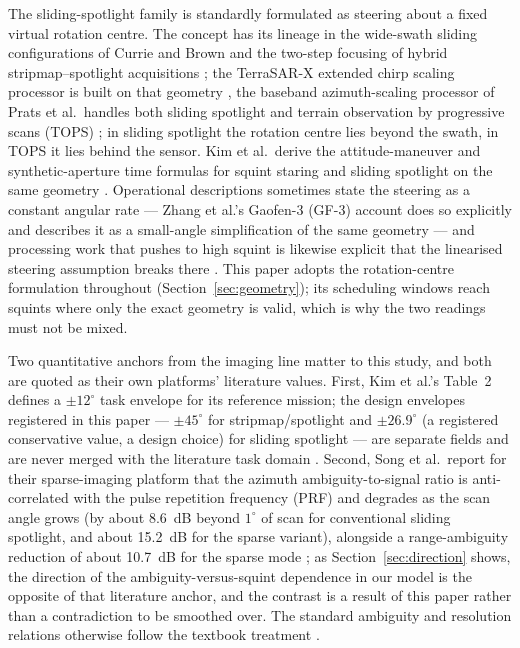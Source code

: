 \documentclass[preprint,authoryear]{elsarticle}
\begin{document}
The sliding-spotlight family is standardly formulated as steering about a fixed virtual rotation centre. The concept has its lineage in the wide-swath sliding configurations of Currie and Brown \citep{currie1992wideswath} and the two-step focusing of hybrid stripmap--spotlight acquisitions \citep{lanari2001hybrid}; the TerraSAR-X extended chirp scaling processor is built on that geometry \citep{mittermayer2003sliding}, the baseband azimuth-scaling processor of Prats et al.\ handles both sliding spotlight and terrain observation by progressive scans (TOPS) \citep{prats2010processing}; in sliding spotlight the rotation centre lies beyond the swath, in TOPS it lies behind the sensor. Kim et al.\ derive the attitude-maneuver and synthetic-aperture time formulas for squint staring and sliding spotlight on the same geometry \citep{kim2021optimal}. Operational descriptions sometimes state the steering as a constant angular rate --- Zhang et al.'s Gaofen-3 (GF-3) account does so explicitly and describes it as a small-angle simplification of the same geometry \citep{zhang2018sliding} --- and processing work that pushes to high squint is likewise explicit that the linearised steering assumption breaks there \citep{guo2011extended,ren2025high}. This paper adopts the rotation-centre formulation throughout (Section~\ref{sec:geometry}); its scheduling windows reach squints where only the exact geometry is valid, which is why the two readings must not be mixed.

Two quantitative anchors from the imaging line matter to this study, and both are quoted as their own platforms' literature values. First, Kim et al.'s Table~2 defines a $\pm 12^{\circ}$ task envelope for its reference mission; the design envelopes registered in this paper --- $\pm 45^{\circ}$ for stripmap/spotlight and $\pm 26.9^{\circ}$ (a registered conservative value, a design choice) for sliding spotlight --- are separate fields and are never merged with the literature task domain \citep{kim2021optimal}. Second, Song et al.\ report for their sparse-imaging platform that the azimuth ambiguity-to-signal ratio is anti-correlated with the pulse repetition frequency (PRF) and degrades as the scan angle grows (by about 8.6~dB beyond $1^{\circ}$ of scan for conventional sliding spotlight, and about 15.2~dB for the sparse variant), alongside a range-ambiguity reduction of about 10.7~dB for the sparse mode \citep{song2025spaceborne}; as Section~\ref{sec:direction} shows, the direction of the ambiguity-versus-squint dependence in our model is the opposite of that literature anchor, and the contrast is a result of this paper rather than a contradiction to be smoothed over. The standard ambiguity and resolution relations otherwise follow the textbook treatment \citep{cumming2005digital}.
\end{document}
